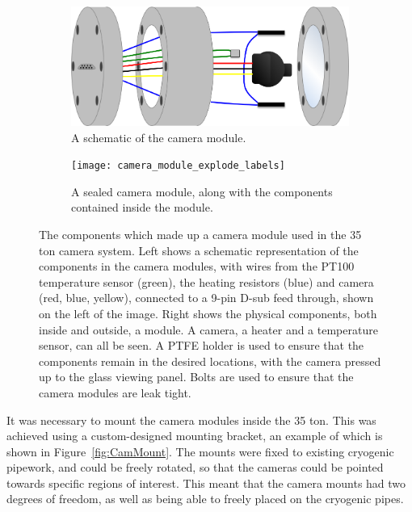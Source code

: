 \begin{figure}
  \centering
  \begin{subfigure}{0.45\textwidth}
    \centering
    \includegraphics[width=\textwidth]{cam_in_housing_diagram}
    \caption{A schematic of the camera module.}
  \end{subfigure}
  \hspace{0.08\textwidth}
  \begin{subfigure}{0.45\textwidth}
    \centering
    \texttt{[image: camera\_module\_explode\_labels]}
    \caption{A sealed camera module, along with the components contained inside the module.}
  \end{subfigure}
  \caption[The components which made up a camera module used in the 35 ton camera system]
          {The components which made up a camera module used in the 35 ton camera system. Left shows a schematic representation of the components in the camera modules, with wires from the PT100 temperature sensor (green), the heating resistors (blue) and camera (red, blue, yellow), connected to a 9-pin D-sub feed through, shown on the left of the image. Right shows the physical components, both inside and outside, a module. A camera, a heater and a temperature sensor, can all be seen. A PTFE holder is used to ensure that the components remain in the desired locations, with the camera pressed up to the glass viewing panel. Bolts are used to ensure that the camera modules are leak tight.}
  \label{fig:CamModule}
\end{figure}

It was necessary to mount the camera modules inside the 35 ton. This was achieved using a custom-designed mounting bracket, an example of which is shown in Figure~\ref{fig:CamMount}. The mounts were fixed to existing cryogenic pipework, and could be freely rotated, so that the cameras could be pointed towards specific regions of interest. This meant that the camera mounts had two degrees of freedom, as well as being able to freely placed on the cryogenic pipes. \\

